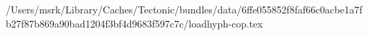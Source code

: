 /Users/msrk/Library/Caches/Tectonic/bundles/data/6ffe055852f8faf66c0acbe1a7fb27f87b869a90bad1204f3bf4d9683f597c7c/loadhyph-cop.tex